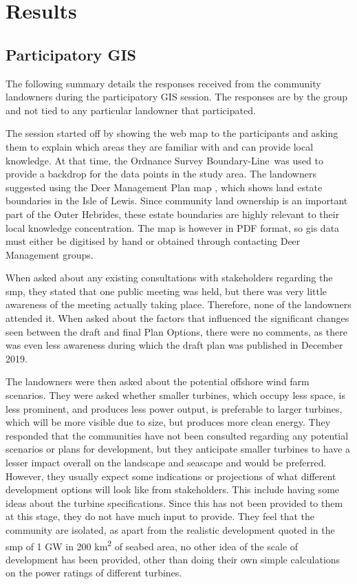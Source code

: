 \chapter{Results}

\section{Participatory GIS}

The following summary details the responses received from the community landowners during the participatory GIS session. The responses are by the group and not tied to any particular landowner that participated.

The session started off by showing the web map to the participants and asking them to explain which areas they are familiar with and can provide local knowledge. At that time, the Ordnance Survey Boundary-Line\texttrademark\ was used to provide a backdrop for the data points in the study area. The landowners suggested using the Deer Management Plan map \autocite{dmg-map}, which shows land estate boundaries in the Isle of Lewis. Since community land ownership is an important part of the Outer Hebrides, these estate boundaries are highly relevant to their local knowledge concentration. The map is however in PDF format, so \gls{gis} data must either be digitised by hand or obtained through contacting Deer Management groups.

When asked about any existing consultations with stakeholders regarding the \gls{smp}, they stated that one public meeting was held, but there was very little awareness of the meeting actually taking place. Therefore, none of the landowners attended it. When asked about the factors that influenced the significant changes seen between the draft and final Plan Options, there were no comments, as there was even less awareness during which the draft plan was published in December 2019.

The landowners were then asked about the potential offshore wind farm scenarios. They were asked whether smaller turbines, which occupy less space, is less prominent, and produces less power output, is preferable to larger turbines, which will be more visible due to size, but produces more clean energy. They responded that the communities have not been consulted regarding any potential scenarios or plans for development, but they anticipate smaller turbines to have a lesser impact overall on the landscape and seascape and would be preferred. However, they usually expect some indications or projections of what different development options will look like from stakeholders. This include having some ideas about the turbine specifications. Since this has not been provided to them at this stage, they do not have much input to provide. They feel that the community are isolated, as apart from the realistic development quoted in the \gls{smp} of 1 GW in 200 km\textsuperscript{2} of seabed area, no other idea of the scale of development has been provided, other than doing their own simple calculations on the power ratings of different turbines.

